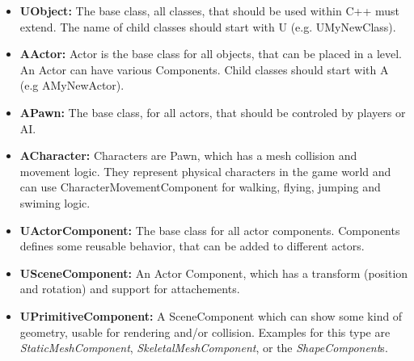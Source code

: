 \documentclass[10pt,a4paper]{article}
\begin{document}
\begin{multicols*}{2}
	\begin{itemize}
		\item \textbf{UObject:} The base class, all classes, that should be used within C++ must extend. The name of child classes should start with U (e.g. UMyNewClass).
		\item \textbf{AActor:} Actor is the base class for all objects, that can be placed in a level. An Actor can have various Components. Child classes should start with A (e.g AMyNewActor).
		\item \textbf{APawn:} The base class, for all actors, that should be controled by players or AI.
		\item \textbf{ACharacter:} Characters are Pawn, which has a mesh collision and movement logic. They represent physical characters in the game world and can use CharacterMovementComponent for walking, flying, jumping and swiming logic.
		\item \textbf{UActorComponent:} The base class for all actor components. Components defines some reusable behavior, that can be added to different actors.
		\item \textbf{USceneComponent:} An Actor Component, which has a transform (position and rotation) and support for attachements.
		\item \textbf{UPrimitiveComponent:} A SceneComponent which can show some kind of geometry, usable for rendering and/or collision. Examples for this type are \emph{StaticMeshComponent}, \emph{SkeletalMeshComponent}, or the \emph{ShapeComponent}s.
		
	\end{itemize}
	

\end{multicols*}
\end{document}
